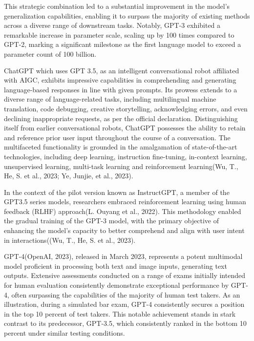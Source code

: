 \documentclass[fleqn,10pt]{thescipub} %
\begin{document}
This strategic combination led to a substantial improvement in the model's generalization capabilities, enabling it to surpass the majority of existing methods across a diverse range of downstream tasks. Notably, GPT-3 exhibited a remarkable increase in parameter scale, scaling up by 100 times compared to GPT-2, marking a significant milestone as the first language model to exceed a parameter count of 100 billion.

ChatGPT which uses GPT 3.5, as an intelligent conversational robot affiliated with AIGC, exhibits impressive capabilities in comprehending and generating language-based responses in line with given prompts. Its prowess extends to a diverse range of language-related tasks, including multilingual machine translation, code debugging, creative storytelling, acknowledging errors, and even declining inappropriate requests, as per the official declaration. Distinguishing itself from earlier conversational robots, ChatGPT possesses the ability to retain and reference prior user input throughout the course of a conversation. The multifaceted functionality is grounded in the amalgamation of state-of-the-art technologies, including deep learning, instruction fine-tuning, in-context learning, unsupervised learning, multi-task learning and reinforcement learning(Wu, T., He, S. et al., 2023; Ye, Junjie, et al., 2023).

In the context of the pilot version known as InstructGPT, a member of the GPT3.5 series models, researchers embraced reinforcement learning using human feedback (RLHF) approach(L. Ouyang et al., 2022). This methodology enabled the gradual training of the GPT-3 model, with the primary objective of enhancing the model's capacity to better comprehend and align with user intent in interactions((Wu, T., He, S. et al., 2023).



GPT-4(OpenAI, 2023), released in March 2023, represents a potent multimodal model proficient in processing both text and image inputs, generating text outputs. Extensive assessments conducted on a range of exams initially intended for human evaluation consistently demonstrate exceptional performance by GPT-4, often surpassing the capabilities of the majority of human test takers. As an illustration, during a simulated bar exam, GPT-4 consistently secures a position in the top 10 percent of test takers. This notable achievement stands in stark contrast to its predecessor, GPT-3.5, which consistently ranked in the bottom 10 percent under similar testing conditions.
\end{document}
